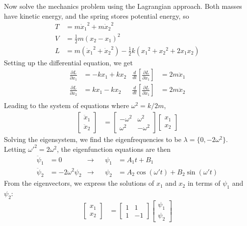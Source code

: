 Now solve the mechanics problem using the Lagrangian approach. Both masses have
kinetic energy, and the spring stores potential energy, so
\begin{align*}
    T &= m{\dot x_1}^2 + m{\dot x_2}^2 \\
    V &= \frac 12 m (x_2 - x_1)^2 \\
    L &= m ({\dot x_1}^2 + {\dot x_2}^2) - \frac 12 k({x_1}^2 + {x_2}^2 + 2x_1x_2)
\end{align*}
Setting up the differential equation, we get
\begin{align*}
    \frac{\partial L}{\partial x_1} &= -kx_1 + kx_2	& \frac{d}{dt}
	\left[\frac{\partial L}{\partial \dot x_1}\right] &= 2m \ddot x_1 \\
    \frac{\partial L}{\partial x_2} &=  kx_1 - kx_2	& \frac{d}{dt}
	\left[\frac{\partial L}{\partial \dot x_1}\right] &= 2m \ddot x_2 \\
\end{align*}
Leading to the system of equations where ${\omega}^2 = k/2m$,
\begin{align*}
    \begin{bmatrix} \ddot x_1 \\ \ddot x_2 \end{bmatrix} &=
	\begin{bmatrix} -{\omega}^2 & {\omega}^2 \\ {\omega}^2 & -{\omega}^2 \end{bmatrix}
	\begin{bmatrix} x_1 \\ x_2 \end{bmatrix}
\end{align*}
Solving the eigensystem, we find the eigenfrequencies to be ${\lambda} = \{0, -2{\omega}^2\}$.
Letting ${{\omega}'}^2 = 2{\omega}^2$, the eigenfunction equations are then
\begin{align*}
    \ddot \psi _1 &= 0
	& \rightarrow&&
	\psi _1 &= A_1t + B_1 \\
    \ddot \psi _2 &= -2{\omega}^2 \psi _2
	& \rightarrow&&
	\psi _2 &= A_2\cos({\omega}'t) + B_2\sin({\omega}'t)
\end{align*}
From the eigenvectors, we express the solutions of $x_1$ and $x_2$ in terms of
$\psi _1$ and $\psi _2$:
\begin{align*}
    \begin{bmatrix} x_1 \\ x_2 \end{bmatrix} &=
	\begin{bmatrix} 1 & 1 \\ 1 & -1 \end{bmatrix}
	\begin{bmatrix} \psi _1 \\ \psi _2 \end{bmatrix}
\end{align*}
